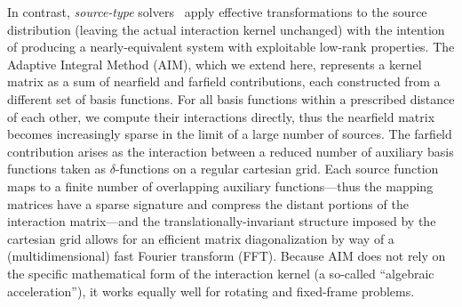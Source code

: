 In contrast, \emph{source-type} solvers~\cite{Bleszynski1996,Yilmaz2004,Kapur1997} apply effective transformations to the source distribution (leaving the actual interaction kernel unchanged) with the intention of producing a nearly-equivalent system with exploitable low-rank properties.
The Adaptive Integral Method (AIM), which we extend here, represents a kernel matrix as a sum of nearfield and farfield contributions, each constructed from a different set of basis functions.
For all basis functions within a prescribed distance of each other, we compute their interactions directly, thus the nearfield matrix becomes increasingly sparse in the limit of a large number of sources.
The farfield contribution arises as the interaction between a reduced number of auxiliary basis functions taken as $\delta$-functions on a regular cartesian grid.
Each source function maps to a finite number of overlapping auxiliary functions---thus the mapping matrices have a sparse signature and compress the distant portions of the interaction matrix---and the translationally-invariant structure imposed by the cartesian grid allows for an efficient matrix diagonalization by way of a (multidimensional) fast Fourier transform (FFT).
Because AIM does not rely on the specific mathematical form of the interaction kernel (a so-called ``algebraic acceleration''), it works equally well for rotating and fixed-frame problems.

